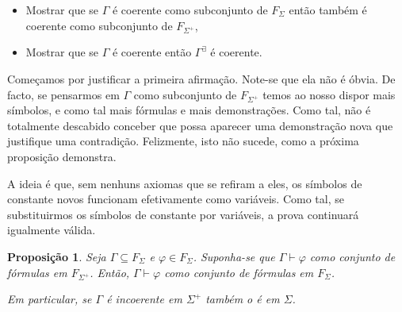 \documentclass{report}
\newtheorem{prop}{Proposição}
\theoremstyle{definition}
\theoremstyle{remark}
\begin{document}
	\begin{itemize}
	\item Mostrar que se $\Gamma$ é coerente como subconjunto de $F_\Sigma$ então também é coerente como subconjunto de $F_{\Sigma^+}$,
	
	\item Mostrar que se $\Gamma$ é coerente então $\Gamma^\exists$ é coerente.
	\end{itemize}
	
	Começamos por justificar a primeira afirmação. Note-se que ela não é óbvia. De facto, se pensarmos em $\Gamma$ como subconjunto de $F_{\Sigma^+}$ temos ao nosso dispor mais símbolos, e como tal mais fórmulas e mais demonstrações. Como tal, não é totalmente descabido conceber que possa aparecer uma demonstração nova que justifique uma contradição. Felizmente, isto não sucede, como a próxima proposição demonstra.
	
	A ideia é que, sem nenhuns axiomas que se refiram a eles, os símbolos de constante novos funcionam efetivamente como variáveis. Como tal, se substituirmos os símbolos de constante por variáveis, a prova continuará igualmente válida.
	
	\begin{prop}\label{coherenceinplus}
	Seja $\Gamma \subseteq F_\Sigma$ e $\varphi \in F_\Sigma$. Suponha-se que $\Gamma \vdash \varphi$ como conjunto de fórmulas em $F_{\Sigma^+}$. Então, $\Gamma \vdash \varphi$ como conjunto de fórmulas em $F_\Sigma$.
	
	Em particular, se $\Gamma$ é incoerente em $\Sigma^+$ também o é em $\Sigma$.
	\end{prop}
	
\end{document}
